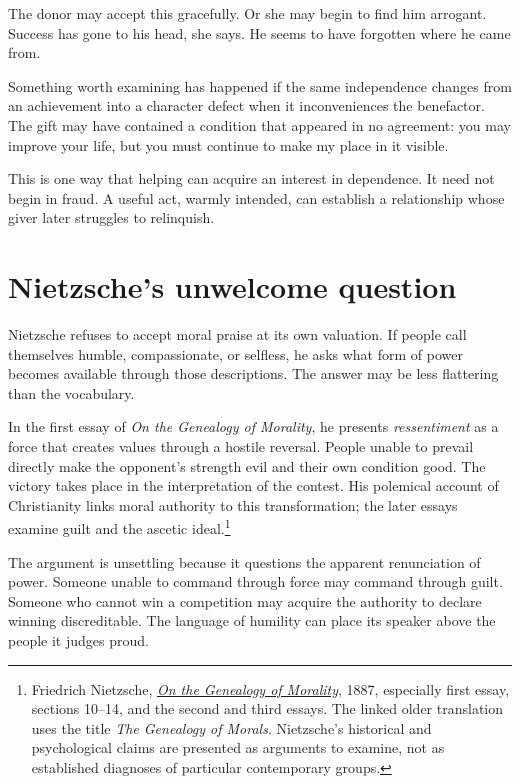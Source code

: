 \documentclass[12pt,a4paper]{book}
\begin{document}
The donor may accept this gracefully. Or she may begin to find him arrogant. Success has gone to his head, she says. He seems to have forgotten where he came from.

Something worth examining has happened if the same independence changes from an achievement into a character defect when it inconveniences the benefactor. The gift may have contained a condition that appeared in no agreement: you may improve your life, but you must continue to make my place in it visible.

This is one way that helping can acquire an interest in dependence. It need not begin in fraud. A useful act, warmly intended, can establish a relationship whose giver later struggles to relinquish.

\section*{Nietzsche's unwelcome question}

Nietzsche refuses to accept moral praise at its own valuation. If people call themselves humble, compassionate, or selfless, he asks what form of power becomes available through those descriptions. The answer may be less flattering than the vocabulary.

In the first essay of \emph{On the Genealogy of Morality}, he presents \emph{ressentiment} as a force that creates values through a hostile reversal. People unable to prevail directly make the opponent's strength evil and their own condition good. The victory takes place in the interpretation of the contest. His polemical account of Christianity links moral authority to this transformation; the later essays examine guilt and the ascetic ideal.\footnote{Friedrich Nietzsche, \href{https://www.gutenberg.org/files/52319/52319-h/52319-h.htm}{\emph{On the Genealogy of Morality}}, 1887, especially first essay, sections 10--14, and the second and third essays. The linked older translation uses the title \emph{The Genealogy of Morals}. Nietzsche's historical and psychological claims are presented as arguments to examine, not as established diagnoses of particular contemporary groups.}

The argument is unsettling because it questions the apparent renunciation of power. Someone unable to command through force may command through guilt. Someone who cannot win a competition may acquire the authority to declare winning discreditable. The language of humility can place its speaker above the people it judges proud.
\end{document}
